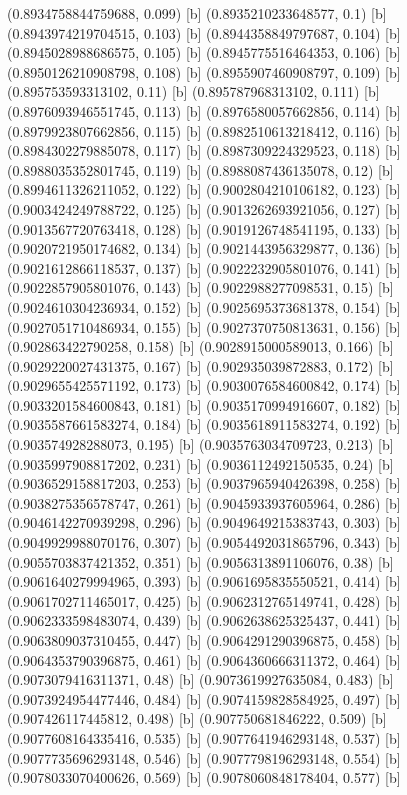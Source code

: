 {{{(0.8934758844759688, 0.099) [b] 
(0.8935210233648577, 0.1) [b] 
(0.8943974219704515, 0.103) [b] 
(0.8944358849797687, 0.104) [b] 
(0.8945028988686575, 0.105) [b] 
(0.8945775516464353, 0.106) [b] 
(0.8950126210908798, 0.108) [b] 
(0.8955907460908797, 0.109) [b] 
(0.895753593313102, 0.11) [b] 
(0.895787968313102, 0.111) [b] 
(0.8976093946551745, 0.113) [b] 
(0.8976580057662856, 0.114) [b] 
(0.8979923807662856, 0.115) [b] 
(0.8982510613218412, 0.116) [b] 
(0.8984302279885078, 0.117) [b] 
(0.8987309224329523, 0.118) [b] 
(0.8988035352801745, 0.119) [b] 
(0.8988087436135078, 0.12) [b] 
(0.8994611326211052, 0.122) [b] 
(0.9002804210106182, 0.123) [b] 
(0.9003424249788722, 0.125) [b] 
(0.9013262693921056, 0.127) [b] 
(0.9013567720763418, 0.128) [b] 
(0.9019126748541195, 0.133) [b] 
(0.9020721950174682, 0.134) [b] 
(0.9021443956329877, 0.136) [b] 
(0.9021612866118537, 0.137) [b] 
(0.9022232905801076, 0.141) [b] 
(0.9022857905801076, 0.143) [b] 
(0.9022988277098531, 0.15) [b] 
(0.9024610304236934, 0.152) [b] 
(0.9025695373681378, 0.154) [b] 
(0.9027051710486934, 0.155) [b] 
(0.9027370750813631, 0.156) [b] 
(0.902863422790258, 0.158) [b] 
(0.9028915000589013, 0.166) [b] 
(0.9029220027431375, 0.167) [b] 
(0.902935039872883, 0.172) [b] 
(0.9029655425571192, 0.173) [b] 
(0.9030076584600842, 0.174) [b] 
(0.9033201584600843, 0.181) [b] 
(0.9035170994916607, 0.182) [b] 
(0.9035587661583274, 0.184) [b] 
(0.9035618911583274, 0.192) [b] 
(0.903574928288073, 0.195) [b] 
(0.9035763034709723, 0.213) [b] 
(0.9035997908817202, 0.231) [b] 
(0.9036112492150535, 0.24) [b] 
(0.9036529158817203, 0.253) [b] 
(0.9037965940426398, 0.258) [b] 
(0.9038275356578747, 0.261) [b] 
(0.9045933937605964, 0.286) [b] 
(0.9046142270939298, 0.296) [b] 
(0.9049649215383743, 0.303) [b] 
(0.9049929988070176, 0.307) [b] 
(0.9054492031865796, 0.343) [b] 
(0.9055703837421352, 0.351) [b] 
(0.9056313891106076, 0.38) [b] 
(0.9061640279994965, 0.393) [b] 
(0.9061695835550521, 0.414) [b] 
(0.9061702711465017, 0.425) [b] 
(0.9062312765149741, 0.428) [b] 
(0.9062333598483074, 0.439) [b] 
(0.9062638625325437, 0.441) [b] 
(0.9063809037310455, 0.447) [b] 
(0.9064291290396875, 0.458) [b] 
(0.9064353790396875, 0.461) [b] 
(0.9064360666311372, 0.464) [b] 
(0.9073079416311371, 0.48) [b] 
(0.9073619927635084, 0.483) [b] 
(0.9073924954477446, 0.484) [b] 
(0.9074159828584925, 0.497) [b] 
(0.907426117445812, 0.498) [b] 
(0.907750681846222, 0.509) [b] 
(0.9077608164335416, 0.535) [b] 
(0.9077641946293148, 0.537) [b] 
(0.9077735696293148, 0.546) [b] 
(0.9077798196293148, 0.554) [b] 
(0.9078033070400626, 0.569) [b] 
(0.9078060848178404, 0.577) [b] 
}}}
